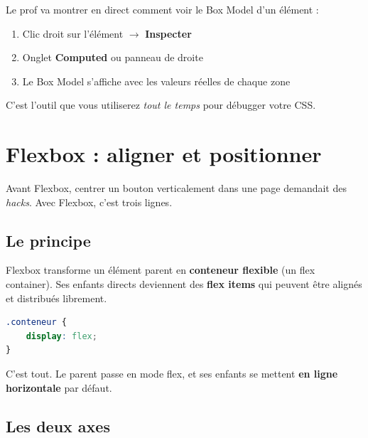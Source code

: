 \documentclass[11pt,a4paper]{article}
\begin{document}
\begin{infobox}
Le prof va montrer en direct comment voir le Box Model d'un élément :
\begin{enumerate}[nosep]
    \item Clic droit sur l'élément $\to$ \textbf{Inspecter}
    \item Onglet \textbf{Computed} ou panneau de droite
    \item Le Box Model s'affiche avec les valeurs réelles de chaque zone
\end{enumerate}
C'est l'outil que vous utiliserez \emph{tout le temps} pour débugger
votre CSS.
\end{infobox}

\newpage

\section{Flexbox : aligner et positionner}

Avant Flexbox, centrer un bouton verticalement dans une page demandait
des \emph{hacks}. Avec Flexbox, c'est trois lignes.

\subsection{Le principe}

Flexbox transforme un élément parent en \textbf{conteneur flexible} (un
\og{}flex container\fg{}). Ses enfants directs deviennent des
\textbf{flex items} qui peuvent être alignés et distribués librement.

\begin{lstlisting}[language=CSS]
.conteneur {
    display: flex;
}
\end{lstlisting}

C'est tout. Le parent passe en mode flex, et ses enfants se mettent
\textbf{en ligne horizontale} par défaut.

\subsection{Les deux axes}
\end{document}
